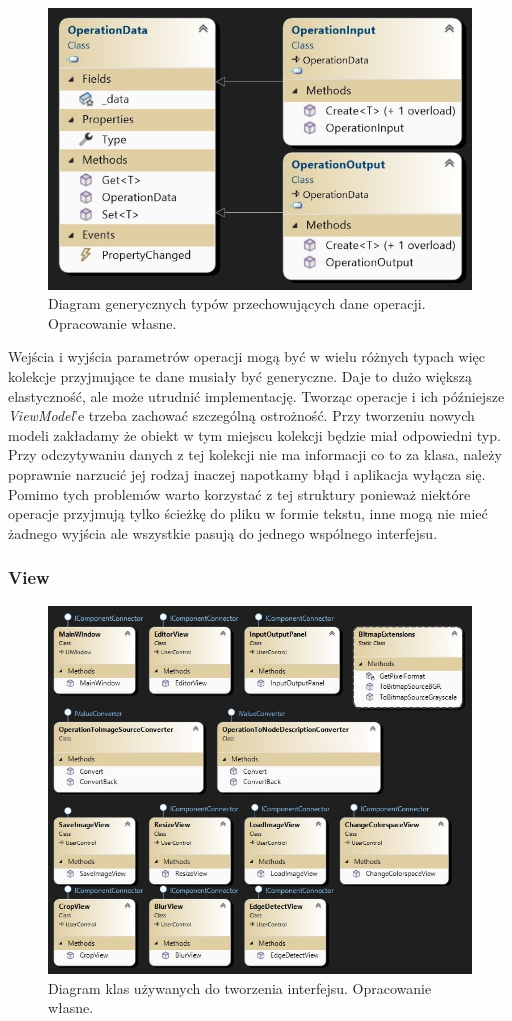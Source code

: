 \begin{figure}[H]
    \centering
    \includegraphics[width=0.6\linewidth]{images/Picture12.jpg}
    \caption{Diagram generycznych typów przechowujących dane operacji. Opracowanie własne.}
    \label{fig:input}
\end{figure}

Wejścia i wyjścia parametrów operacji mogą być w wielu różnych typach więc kolekcje przyjmujące te dane musiały być generyczne. 
Daje to dużo większą elastyczność, ale może utrudnić implementację. 
Tworząc operacje i ich późniejsze \textit{ViewModel}'e trzeba zachować szczególną ostrożność. 
Przy tworzeniu nowych modeli zakładamy że obiekt w tym miejscu kolekcji będzie miał odpowiedni typ. 
Przy odczytywaniu danych z tej kolekcji nie ma informacji co to za klasa, należy poprawnie narzucić jej rodzaj inaczej napotkamy błąd i aplikacja wyłącza się.
Pomimo tych problemów warto korzystać z tej struktury ponieważ niektóre operacje przyjmują tylko ścieżkę do pliku w formie tekstu, inne mogą nie mieć żadnego wyjścia ale wszystkie pasują do jednego wspólnego interfejsu.

\subsubsection{View} 

\begin{figure}[H]
    \centering
    \includegraphics[width=0.8\linewidth]{images/Picture19.jpg}
    \caption{Diagram klas używanych do tworzenia interfejsu. Opracowanie własne.}
    \label{fig:viewArch}
\end{figure}

